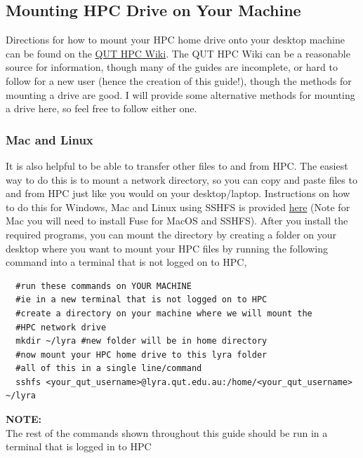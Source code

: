\subsection{Mounting HPC Drive on Your Machine}
\label{sec:mounting_win}
Directions for how to mount your HPC home drive onto your desktop machine can be found on the \href{https://wiki.qut.edu.au/pages/viewpage.action?pageId=244125273}{QUT HPC Wiki}. The QUT HPC Wiki can be a reasonable source for information, though many of the guides are incomplete, or hard to follow for a new user (hence the creation of this guide!), though the methods for mounting a drive are good. I will provide some alternative methods for mounting a drive here, so feel free to follow either one.
%
%
\subsubsection{Mac and Linux}
It is also helpful to be able to transfer other files to and from HPC. The easiest way to do this is to mount a network directory, so you can copy and paste files to and from HPC just like you would on your desktop/laptop. Instructions on how to do this for Windows, Mac and Linux using SSHFS is provided \href{https://www.digitalocean.com/community/tutorials/how-to-use-sshfs-to-mount-remote-file-systems-over-ssh}{here} (Note for Mac you will need to install Fuse for MacOS and SSHFS). After you install the required programs, you can mount the directory by creating a folder on your desktop where you want to mount your HPC files by running the following command into a terminal that is not logged on to HPC,
%
%
\\
\par
\begin{verbatim}
  #run these commands on YOUR MACHINE
  #ie in a new terminal that is not logged on to HPC
  #create a directory on your machine where we will mount the
  #HPC network drive
  mkdir ~/lyra #new folder will be in home directory
  #now mount your HPC home drive to this lyra folder
  #all of this in a single line/command
  sshfs <your_qut_username>@lyra.qut.edu.au:/home/<your_qut_username> ~/lyra
\end{verbatim}
%
%
%
\par
\begin{story}
  \textbf{NOTE:}
  \\
  The rest of the commands shown throughout this guide should be run in a terminal that is logged in to HPC
\end{story}
%
%
